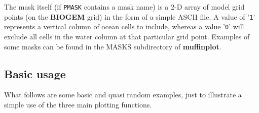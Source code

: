 \documentclass[11pt,fleqn]{book} %
\begin{document}
The mask itself (if \texttt{PMASK} contains a mask name) is a 2-D array of model grid points (on the \textbf{BIOGEM} grid) in the form of a simple ASCII file. A value of '\texttt{1}' represents a vertical column of ocean cells to include, whereas a value '\texttt{0}' will exclude all cells in the water column at that particular grid point. Examples of some masks can be found in the \footnotesize\textsf{MASKS }\normalsize subdirectory of \textbf{muffinplot}.
        
%
\pagebreak

\subsection{Basic usage}

What follows are some basic and quasi random examples, just to illustrate a simple use of the three main plotting functions.
\end{document}
